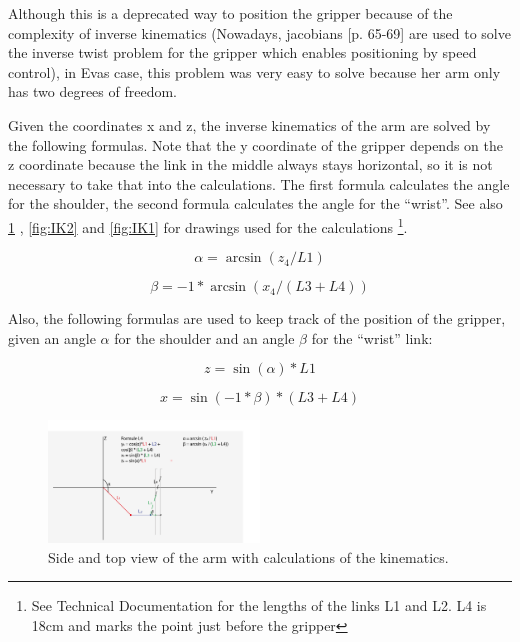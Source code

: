\documentclass[project_eva.tex]{subfiles}
\begin{document}
Although this is a deprecated way to position the gripper because of the complexity of inverse kinematics  (Nowadays, 
jacobians \cite{jacobian} [p. 65-69] are used to solve the inverse twist 
problem for the gripper which enables positioning by speed control), in Eva\textquotesingle s case, this problem was 
very easy to solve because her arm only has two degrees of freedom. 

Given the coordinates x and z, the inverse kinematics of the arm are solved by the following formulas. Note that the y 
coordinate of the gripper depends on the z coordinate because the link in the middle always stays horizontal, so it is 
not necessary to take that into the calculations. The first formula calculates the angle for the shoulder, the second 
formula calculates the angle for the ``wrist''. See also \ref{fig:IK0} , \ref{fig:IK2} and \ref{fig:IK1} for drawings 
used for the calculations \footnote{See Technical Documentation for the lengths of the links L1 and L2. L4 is 18cm and 
marks the point just before the gripper}.

\begin{equation*}
\alpha = \arcsin(z_4/L1)
\end{equation*}

\begin{equation*}
\beta = -1 * \arcsin(x_4/(L3 + L4))
\end{equation*}

Also, the following formulas are used to keep track of the position of the gripper, given an angle $\alpha$ for the 
shoulder and an angle $\beta$ for the ``wrist'' link:

\begin{equation*}
z = \sin(\alpha)*L1
\end{equation*}

\begin{equation*}
x = \sin(-1 * \beta)*(L3 + L4)
\end{equation*}

\begin{figure}[h!]
	\centering
	\mbox{\includegraphics[width=0.5\textwidth]{Images/3d_zijenbovenaanzicht.png}}
	\caption{Side and top view of the arm with calculations of the kinematics.}
	\label{fig:IK0}
\end{figure}
\end{document}
